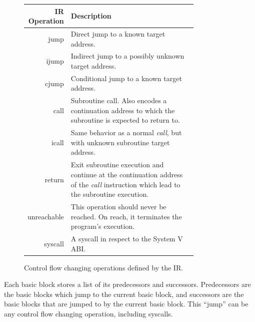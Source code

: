 \documentclass[course=eragp]{aspdoc}
\begin{document}
\begin{figure}
    \begin{center}
        \def\arraystretch{1.5}
        \begin{tabular}{r | p{0.8\linewidth}}
            \hline
            IR Operation & Description                                                                   \\ [0.5ex]
            \hline
            jump         & Direct jump to a known target address.                                        \\
            ijump        & Indirect jump to a possibly unknown target address.                           \\
            cjump        & Conditional jump to a known target address.                                   \\
            call         & Subroutine call. Also encodes a continuation address to which the subroutine
            is expected to return to.                                                                    \\
            icall        & Same behavior as a normal \textit{call}, but with unknown subroutine target
            address.                                                                                     \\
            return       & Exit subroutine execution and continue at the continuation address of the
            \textit{call} instruction which lead to the subroutine execution.                            \\
            unreachable  & This operation should never be reached. On reach, it terminates the program's
            execution.                                                                                   \\
            syscall      & A syscall in respect to the System V ABI.                                     \\
            \hline
        \end{tabular}
        \caption{Control flow changing operations defined by the IR.}\label{figure:cfops}
    \end{center}
\end{figure}

\par

Each basic block stores a list of its predecessors and successors. Predecessors are the basic blocks which jump to
the current basic block, and successors are the basic blocks that are jumped to by the current basic
block. This ``jump'' can be any control flow changing operation, including syscalls.
\end{document}
